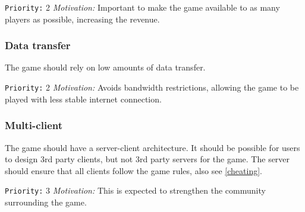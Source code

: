 \documentclass[a4paper,10pt]{article}
\newcommand{\prio}[2]{\texttt{Priority:} #1 \emph{Motivation:} #2}
\begin{document}
\prio{2}{Important to make the game available to as many players as possible, increasing the revenue.}


\subsubsection{Data transfer}
The game should rely on low amounts of data transfer.

\prio{2}{Avoids bandwidth restrictions, allowing the game to be played with less stable internet connection.}


\subsubsection{Multi-client}
The game should have a server-client architecture. It should be possible for users to design 3rd party clients, but not 3rd party servers for the game. The server should ensure that all clients follow the game rules, also see \ref{cheating}.

\prio{3}{This is expected to strengthen the community surrounding the game.}
\end{document}
